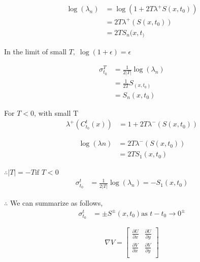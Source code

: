 \documentclass[../report.tex]{subfiles}
\begin{document}
\begin{equation}
  \begin{aligned}
    \log(\lambda_n) &= \log(1 + 2T\lambda^+S(x, t_0)) \\
    &= 2T\lambda^+(S(x, t_0)) \\
    &= 2TS_n(x, t_)
  \end{aligned}
\end{equation}

In the limit of small \(T,\; \log(1+\epsilon) = \epsilon\)

\begin{equation}
  \begin{aligned}
    \sigma_{t_0}^T &= \frac{1}{2|T|}\log(\lambda_n) \\
    &= \frac{1}{2T} S_(x, t_0) \\
    &= S_n(x, t_0)
  \end{aligned}
\end{equation}

For \(T < 0\), with small T
\begin{equation}
  \begin{aligned}
    \lambda^+ (C_{t_0}^t(x)) &= 1 + 2T \lambda^- (S(x, t_0))
  \end{aligned}
\end{equation}

\begin{equation}
  \begin{aligned}
    \log(\lambda n) &= 2T\lambda^- (S(x, t_0)) \\
    &= 2TS_1(x, t_0)
  \end{aligned}
\end{equation}

\(\therefore |T| = -T \text{if } T < 0\)
\begin{equation}
  \begin{aligned}
    \sigma_{t_0}^t &= \frac{1}{2|T|} \log(\lambda_n) = -S_1(x, t_0)
  \end{aligned}
\end{equation}

\(\therefore\) We can summarize as follows,
\begin{equation}
  \begin{aligned}
    \sigma_{t_0}^t &= \pm S^\pm (x, t_0) \text{as } t - t_0 \rightarrow 0^\pm
  \end{aligned}
\end{equation}

\begin{equation}
  \nabla V = \begin{bmatrix}
    \frac{\partial U}{\partial x} & \frac{\partial U}{\partial y} \\[12pt]
    \frac{\partial V}{\partial x} & \frac{\partial V}{\partial y} \\
  \end{bmatrix}
\end{equation}
\end{document}
